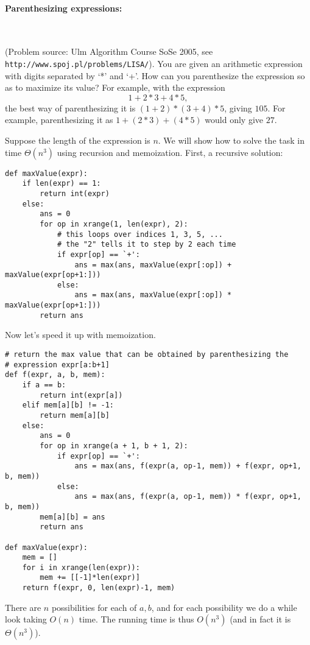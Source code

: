 \documentclass[11pt]{article}
\begin{document}
\paragraph{Parenthesizing expressions:}\ 

\smallskip

\noindent (Problem source: Ulm Algorithm Course SoSe 2005, see
\texttt{http://www.spoj.pl/problems/LISA/}). You are given an
arithmetic expression with digits separated by `*' and `+'.  How can
you parenthesize the expression so as to maximize its value?  For
example, with the expression
$$ 1+2*3+4*5 ,$$
the best way of parenthesizing it is $(1+2)*(3+4)*5$, giving $105$.
For example, parenthesizing it as $1+(2*3)+(4*5)$ would only give
$27$.

Suppose the length of the expression is $n$.  We will show how to
solve the task in time $\Theta(n^3)$ using recursion and memoization.
First, a recursive solution:

\newpage

\begin{verbatim}
def maxValue(expr):
    if len(expr) == 1:
        return int(expr)
    else:
        ans = 0
        for op in xrange(1, len(expr), 2):
            # this loops over indices 1, 3, 5, ...
            # the "2" tells it to step by 2 each time
            if expr[op] == `+':
                ans = max(ans, maxValue(expr[:op]) + maxValue(expr[op+1:]))
            else:
                ans = max(ans, maxValue(expr[:op]) * maxValue(expr[op+1:]))
        return ans
\end{verbatim}

Now let's speed it up with memoization.

\begin{verbatim}
# return the max value that can be obtained by parenthesizing the
# expression expr[a:b+1]
def f(expr, a, b, mem):
    if a == b:
        return int(expr[a])
    elif mem[a][b] != -1:
        return mem[a][b]
    else:
        ans = 0
        for op in xrange(a + 1, b + 1, 2):
            if expr[op] == `+':
                ans = max(ans, f(expr(a, op-1, mem)) + f(expr, op+1, b, mem))
            else:
                ans = max(ans, f(expr(a, op-1, mem)) * f(expr, op+1, b, mem))
        mem[a][b] = ans
        return ans

def maxValue(expr):
    mem = []
    for i in xrange(len(expr)):
        mem += [[-1]*len(expr)]
    return f(expr, 0, len(expr)-1, mem)
\end{verbatim}

There are $n$ possibilities for each of $a,b$, and for each
possibility we do a while look taking $O(n)$ time.  The running time
is thus $O(n^3)$ (and in fact it is $\Theta(n^3)$).
\end{document}
